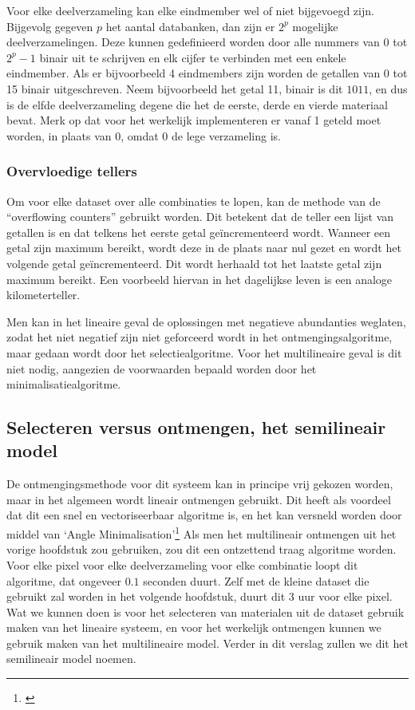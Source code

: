 \documentclass[12pt]{report}
\newcommand{\footcite}[1]{\cite{#1}\let\thefootnote\relax \footnote{\cite{#1} \bibentry{#1}} }
\begin{document}
Voor elke deelverzameling kan elke eindmember wel of niet bijgevoegd zijn. Bijgevolg gegeven $p$ het aantal databanken, dan zijn er $2^p$ mogelijke deelverzamelingen. Deze kunnen gedefinieerd worden door alle nummers van $0$ tot $2^p-1$ binair uit te schrijven en elk cijfer te verbinden met een enkele eindmember. Als er bijvoorbeeld 4 eindmembers zijn worden de getallen van 0 tot 15 binair uitgeschreven. Neem bijvoorbeeld het getal 11, binair is dit $1011$, en dus is de elfde deelverzameling degene die het de eerste, derde en vierde materiaal bevat. Merk op dat voor het werkelijk implementeren er vanaf 1 geteld moet worden, in plaats van 0, omdat 0 de lege verzameling is.

\subsubsection{Overvloedige tellers}
Om voor elke dataset over alle combinaties te lopen, kan de methode van de ``overflowing counters'' gebruikt worden. Dit betekent dat de teller een lijst van getallen is en dat telkens het eerste getal ge\"incrementeerd wordt. Wanneer een getal zijn maximum bereikt, wordt deze in de plaats naar nul gezet en wordt het volgende getal ge\"incrementeerd. Dit wordt herhaald tot het laatste getal zijn maximum bereikt. Een voorbeeld hiervan in het dagelijkse leven is een analoge kilometerteller. 

Men kan in het lineaire geval de oplossingen met negatieve abundanties weglaten, zodat het niet negatief zijn niet geforceerd wordt in het ontmengingsalgoritme, maar gedaan wordt door het selectiealgoritme. Voor het multilineaire geval is dit niet nodig, aangezien de voorwaarden bepaald worden door het minimalisatiealgoritme.  

\subsection{Selecteren versus ontmengen, het semilineair model}

De ontmengingsmethode voor dit systeem kan in principe vrij gekozen worden, maar in het algemeen wordt lineair ontmengen gebruikt. Dit heeft als voordeel dat dit een snel en vectoriseerbaar algoritme is, en het kan versneld worden door middel van `Angle Minimalisation'\footcite{mesma} Als men het multilineair ontmengen uit het vorige hoofdstuk zou gebruiken, zou dit een ontzettend traag algoritme worden. Voor elke pixel voor elke deelverzameling voor elke combinatie loopt dit algoritme, dat ongeveer $0.1$ seconden duurt. Zelf met de kleine dataset die gebruikt zal worden in het volgende hoofdstuk, duurt dit 3 uur voor elke pixel. Wat we kunnen doen is voor het selecteren van materialen uit de dataset gebruik maken van het lineaire systeem, en voor het werkelijk ontmengen kunnen we gebruik maken van het multilineaire model. Verder in dit verslag zullen we dit het semilineair model noemen.
\end{document}

